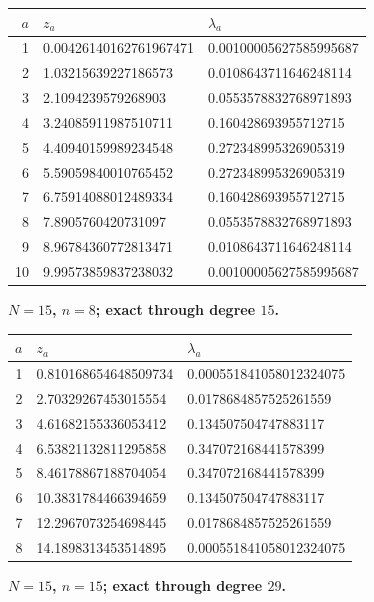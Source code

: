 \begin{center}\small
\begin{tabular}{rll}
$a$ & $z_a$ & $\lambda_a$\\\hline
1 & 0.00426140162761967471 & 0.00100005627585995687\\
2 & 1.03215639227186573 & 0.0108643711646248114\\
3 & 2.1094239579268903 & 0.0553578832768971893\\
4 & 3.24085911987510711 & 0.160428693955712715\\
5 & 4.40940159989234548 & 0.272348995326905319\\
6 & 5.59059840010765452 & 0.272348995326905319\\
7 & 6.75914088012489334 & 0.160428693955712715\\
8 & 7.8905760420731097 & 0.0553578832768971893\\
9 & 8.96784360772813471 & 0.0108643711646248114\\
10 & 9.99573859837238032 & 0.00100005627585995687\\
\end{tabular}
\end{center}
\par\medskip\noindent\textbf{$N=15$, $n=8$; exact through degree $15$.}
\begin{center}\small
\begin{tabular}{rll}
$a$ & $z_a$ & $\lambda_a$\\\hline
1 & 0.810168654648509734 & 0.000551841058012324075\\
2 & 2.70329267453015554 & 0.0178684857525261559\\
3 & 4.61682155336053412 & 0.134507504747883117\\
4 & 6.53821132811295858 & 0.347072168441578399\\
5 & 8.46178867188704054 & 0.347072168441578399\\
6 & 10.3831784466394659 & 0.134507504747883117\\
7 & 12.2967073254698445 & 0.0178684857525261559\\
8 & 14.1898313453514895 & 0.000551841058012324075\\
\end{tabular}
\end{center}
\par\medskip\noindent\textbf{$N=15$, $n=15$; exact through degree $29$.}
